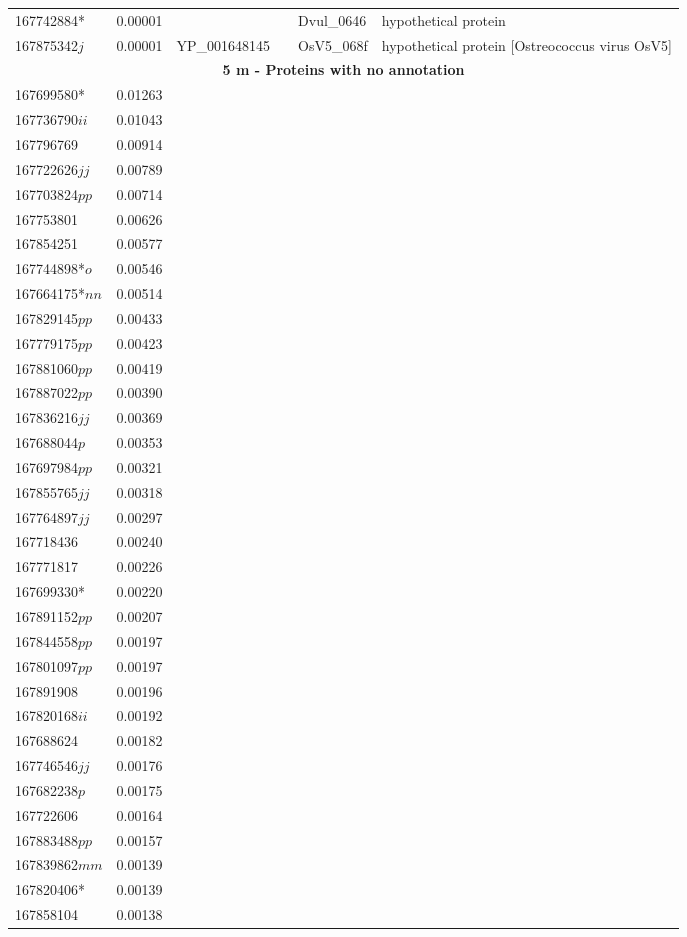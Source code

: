 \begin{landscape}
\begin{longtable}{p{1.6cm}p{1.2cm}p{1.5cm}p{1.5cm}p{2.8cm}p{13.5cm}}
167742884*&0.00001&&&Dvul\_0646&hypothetical protein \\
167875342$j$&0.00001&YP\_001648145&&OsV5\_068f&hypothetical protein [Ostreococcus virus OsV5] \\
\multicolumn{6}{c}{\textbf{5 m - Proteins with no annotation}}  \\
167699580*&0.01263&&&& \\
167736790$ii$&0.01043&&&& \\
167796769&0.00914&&&& \\
167722626$jj$&0.00789&&&& \\
167703824$pp$&0.00714&&&& \\
167753801&0.00626&&&& \\
167854251&0.00577&&&& \\
167744898*$o$&0.00546&&&& \\
167664175*$nn$&0.00514&&&& \\
167829145$pp$&0.00433&&&& \\
167779175$pp$&0.00423&&&& \\
167881060$pp$&0.00419&&&& \\
167887022$pp$&0.00390&&&& \\
167836216$jj$&0.00369&&&& \\
167688044$p$&0.00353&&&& \\
167697984$pp$&0.00321&&&& \\
167855765$jj$&0.00318&&&& \\
167764897$jj$&0.00297&&&& \\
167718436&0.00240&&&& \\
167771817&0.00226&&&& \\
167699330*&0.00220&&&& \\
167891152$pp$&0.00207&&&& \\
167844558$pp$&0.00197&&&& \\
167801097$pp$&0.00197&&&& \\
167891908&0.00196&&&& \\
167820168$ii$&0.00192&&&& \\
167688624&0.00182&&&& \\
167746546$jj$&0.00176&&&& \\
167682238$p$&0.00175&&&& \\
167722606&0.00164&&&& \\
167883488$pp$&0.00157&&&& \\
167839862$mm$&0.00139&&&& \\
167820406*&0.00139&&&& \\
167858104&0.00138&&&& \\

\end{longtable}
\end{landscape}
